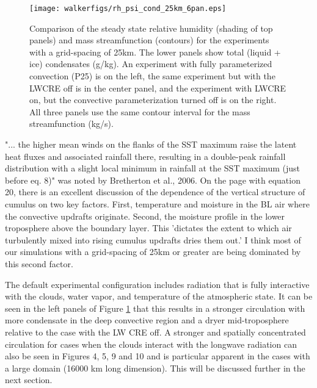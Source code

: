 \documentclass[11pt]{article}   	%
\begin{document}
\begin{figure}
  \centering
      \texttt{[image: walkerfigs/rh\_psi\_cond\_25km\_6pan.eps]}
      \caption{Comparison of the steady state relative humidity (shading of top panels) and mass 
      streamfunction (contours) for the experiments
      with a grid-spacing of 25km.  The lower panels show total (liquid + ice) condensates (g/kg).  
      An experiment with fully parameterized convection (P25) is on the left, the same 
      experiment but with the LWCRE off is in the center panel, and the experiment with LWCRE on, but the convective
      parameterization turned off is on the right.  All three panels use the same contour interval for the mass 
      streamfunction (kg/s).}
  \label{fig:rh_psi_P25vsE25}
\end{figure}

"... the higher mean winds on the flanks of the SST maximum raise the latent heat fluxes and associated rainfall there, resulting in a 
double-peak rainfall distribution with a slight local minimum in rainfall at the SST maximum (just before eq. 8)" 
was noted by Bretherton et al., 2006.  On the page with equation 20, there is an excellent discussion of the dependence of the 
vertical structure of cumulus on two key factors.  First, temperature and moisture in the BL air where the convective updrafts originate.
Second, the moisture profile in the lower troposphere above the boundary layer.  This 'dictates the extent to which air
turbulently mixed into rising cumulus updrafts dries them out.'  I think most of our simulations with a grid-spacing of 25km or 
greater are being dominated by this second factor.    

The default experimental configuration includes radiation that is fully interactive with the clouds, water vapor, and 
temperature of the atmospheric state.  It can be seen in the left panels of Figure \ref{fig:rh_psi_P25vsE25} that this 
results in a stronger circulation with more condensate in the deep convective region and a dryer mid-troposphere
relative to the case with the LW CRE off.   A stronger and spatially concentrated circulation for cases when the 
clouds interact with the longwave radiation can also be seen in Figures 4, 5, 9 and 10 and is particular apparent in 
the cases with a large domain (16000 km long dimension).  This will be discussed further in the next section.  

\end{document}

